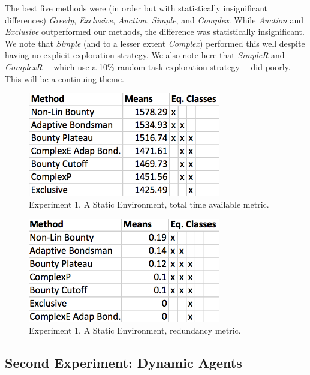\documentclass[letterpaper]{aamas2015}
\newcommand\bump{\vspace{10in}}
\begin{document}

The best five methods were (in order but with statistically insignificant differences) {\it Greedy}, {\it Exclusive}, {\it Auction},  {\it Simple}, and {\it Complex}.  While \textit{Auction} and \textit{Exclusive} outperformed our methods, the difference was statistically insignificant.  We note that {\it Simple} (and to a lesser extent \textit{Complex}) performed this well despite having no explicit exploration strategy.  We also note here that {\it SimpleR} and {\it ComplexR}\,---\,which use a 10\% random task exploration strategy\,---\,did poorly.  This will be a continuing theme. 

\begin{figure}[t]
\begin{center}\includegraphics[width=3.3in]{staticT.png}\end{center}
\vspace{-0.5em}\caption{Experiment 1, A Static Environment, total time available metric.}
\label{staticT}
\end{figure}

\begin{figure}[t]
\begin{center}\includegraphics[width=3.3in]{staticR.png}\end{center}
\vspace{-0.5em}\caption{Experiment 1, A Static Environment, redundancy metric.}
\label{staticR}
\end{figure}

\subsection{Second Experiment: Dynamic Agents}
\end{document}
